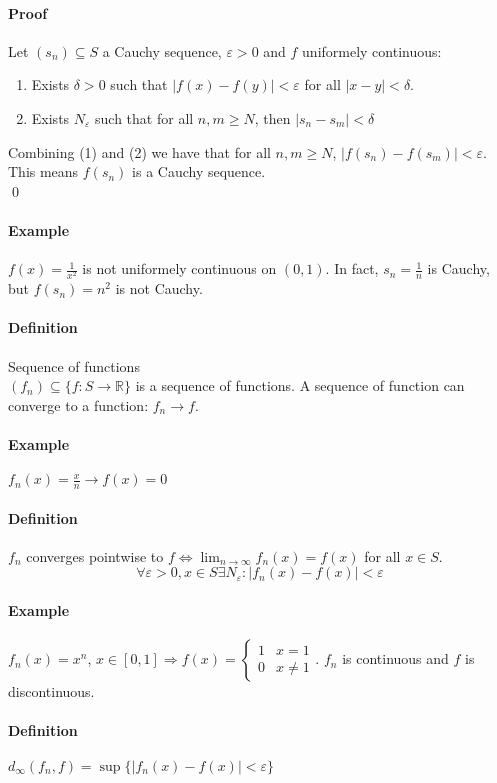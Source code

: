 \documentclass{article}
\newcommand{\abs}[1]{\left|#1\right|}
\newcommand{\func}[3]{#1 : #2 \rightarrow #3}
\newcommand{\limn}{\lim_{n \to \infty}}
\newcommand{\DS}{\displaystyle}
\newcommand{\intcc}[1]{\left[#1\right]}
\newcommand{\R}{\mathbb{R}}
\newcommand{\Ep}{\varepsilon}
\newcommand{\Def}{\paragraph{Definition}}
\newcommand{\Proof}{\paragraph{Proof}}
\newcommand{\Example}{\paragraph{Example}}
\begin{document}
	\Proof Let $(s_n) \subseteq S$ a Cauchy sequence, $\Ep > 0$ and $f$ uniformely
	continuous:
\begin{enumerate}
	\item Exists $\delta > 0$ such that $\abs{f(x)-f(y)} < \Ep$ for all $\abs{x-y}
	< \delta$.
	\item Exists $N_\Ep$ such that for all $n,m \geq N$, then $\abs{s_n - s_m} <
	\delta$
\end{enumerate}
	Combining (1) and (2) we have that for all $n,m \geq N$, $\abs{f(s_n)-f(s_m)}
	< \Ep$. This means $f(s_n)$ is a Cauchy sequence.
\\\qed

	\Example $f(x) = \frac{1}{x^2}$ is not uniformely continuous on $(0,1)$. In
	fact, $s_n = \frac{1}{n}$ is Cauchy, but $f(s_n) = n^2$ is not Cauchy.

	\Def Sequence of functions
\\$(f_n) \subseteq \{ \func{f}{S}{\R} \}$ is a sequence of functions. A sequence
	of function can converge to a function: $f_n \to f$.

	\Example $f_n(x) = \frac{x}{n} \to f(x) = 0$

	\Def $f_n$ converges pointwise to $f \iff \DS \limn{f_n(x)} = f(x)$ for all
	$x \in S$.
\begin{equation*}
	\forall \Ep > 0, x \in S \exists N_\Ep : \abs{f_n(x) - f(x)} < \Ep
\end{equation*}

	\Example $f_n(x) = x^n$, $x \in \intcc{0,1} \Rightarrow f(x) =
	\begin{cases}1 & x = 1 \\ 0 & x \neq 1\end{cases}$. $f_n$ is continuous and
	$f$ is discontinuous.

	\Def $d_\infty(f_n,f) = \sup \{ \abs{f_n(x) - f(x)} < \Ep \}$
\end{document}
